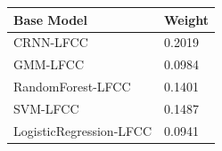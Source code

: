 \begin{tabular}{ll}
\toprule
Base Model & Weight \\
\midrule
CRNN-LFCC & 0.2019 \\
GMM-LFCC & 0.0984 \\
RandomForest-LFCC & 0.1401 \\
SVM-LFCC & 0.1487 \\
LogisticRegression-LFCC & 0.0941 \\
\bottomrule
\end{tabular}
